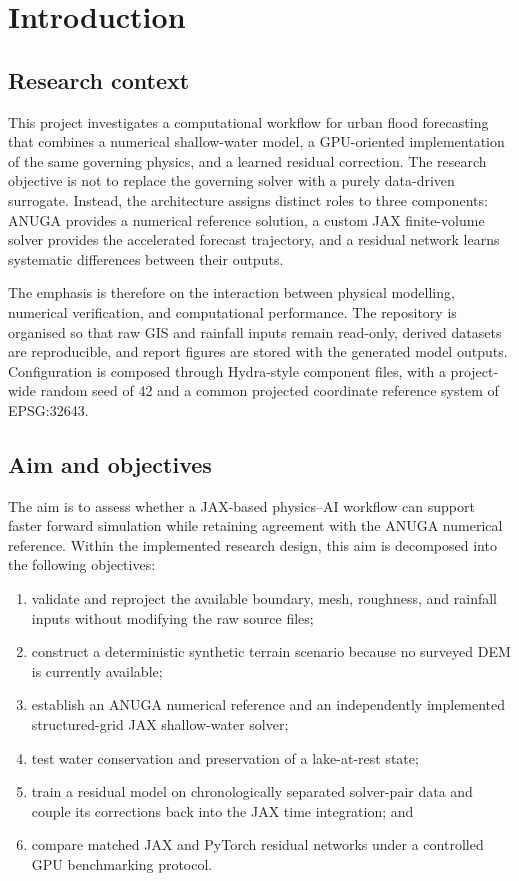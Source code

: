 \section{Introduction}
\label{sec:introduction}

\subsection{Research context}

This project investigates a computational workflow for urban flood forecasting
that combines a numerical shallow-water model, a GPU-oriented implementation
of the same governing physics, and a learned residual correction.  The
research objective is not to replace the governing solver with a purely
data-driven surrogate.  Instead, the architecture assigns distinct roles to
three components: ANUGA provides a numerical reference solution, a custom JAX
finite-volume solver provides the accelerated forecast trajectory, and a
residual network learns systematic differences between their outputs.

The emphasis is therefore on the interaction between physical modelling,
numerical verification, and computational performance.  The repository is
organised so that raw GIS and rainfall inputs remain read-only, derived
datasets are reproducible, and report figures are stored with the generated
model outputs.  Configuration is composed through Hydra-style component files,
with a project-wide random seed of 42 and a common projected coordinate
reference system of EPSG:32643.

\subsection{Aim and objectives}

The aim is to assess whether a JAX-based physics--AI workflow can support
faster forward simulation while retaining agreement with the ANUGA numerical
reference.  Within the implemented research design, this aim is
decomposed into the following objectives:

\begin{enumerate}
    \item validate and reproject the available boundary, mesh, roughness, and
    rainfall inputs without modifying the raw source files;
    \item construct a deterministic synthetic terrain scenario because no
    surveyed DEM is currently available;
    \item establish an ANUGA numerical reference and an independently
    implemented structured-grid JAX shallow-water solver;
    \item test water conservation and preservation of a lake-at-rest state;
    \item train a residual model on chronologically separated solver-pair data
    and couple its corrections back into the JAX time integration; and
    \item compare matched JAX and PyTorch residual networks under a controlled
    GPU benchmarking protocol.
\end{enumerate}

